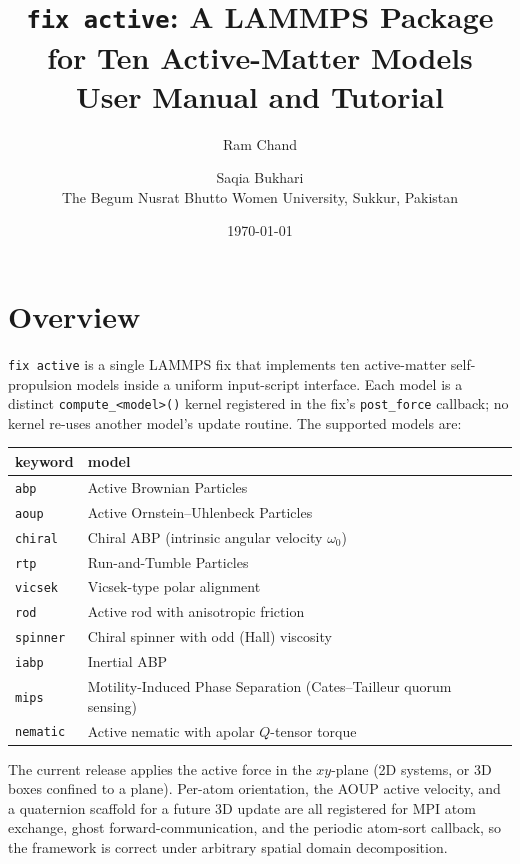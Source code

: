\documentclass[11pt,a4paper]{article}
\title{\texttt{fix active}: A LAMMPS Package for Ten Active-Matter Models\\[6pt]
       \large User Manual and Tutorial}
\author{Ram Chand \and Saqia Bukhari\\[4pt]
        The Begum Nusrat Bhutto Women University, Sukkur, Pakistan}
\date{\today}
\begin{document}
\maketitle
\tableofcontents
\vspace{1em}
\noindent\hrulefill

\section{Overview}

\texttt{fix active} is a single LAMMPS fix that implements ten active-matter
self-propulsion models inside a uniform input-script interface.  Each model
is a distinct \texttt{compute\_<model>()} kernel registered in the fix's
\texttt{post\_force} callback; no kernel re-uses another model's update
routine.  The supported models are:

\begin{center}
\begin{tabular}{l l}
\toprule
keyword       & model \\
\midrule
\texttt{abp}      & Active Brownian Particles \\
\texttt{aoup}     & Active Ornstein--Uhlenbeck Particles \\
\texttt{chiral}   & Chiral ABP (intrinsic angular velocity $\omega_0$) \\
\texttt{rtp}      & Run-and-Tumble Particles \\
\texttt{vicsek}   & Vicsek-type polar alignment \\
\texttt{rod}      & Active rod with anisotropic friction \\
\texttt{spinner}  & Chiral spinner with odd (Hall) viscosity \\
\texttt{iabp}     & Inertial ABP \\
\texttt{mips}     & Motility-Induced Phase Separation (Cates--Tailleur quorum sensing) \\
\texttt{nematic}  & Active nematic with apolar $Q$-tensor torque \\
\bottomrule
\end{tabular}
\end{center}

The current release applies the active force in the $xy$-plane (2D systems,
or 3D boxes confined to a plane).  Per-atom orientation, the AOUP active
velocity, and a quaternion scaffold for a future 3D update are all
registered for MPI atom exchange, ghost forward-communication, and the
periodic atom-sort callback, so the framework is correct under arbitrary
spatial domain decomposition.
\end{document}
